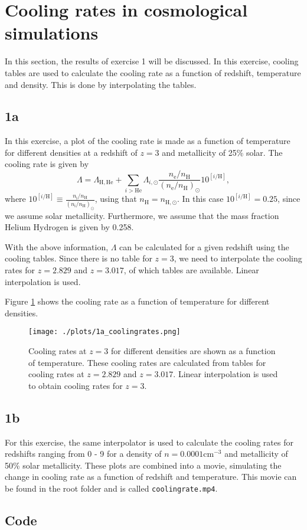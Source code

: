 
\section{Cooling rates in cosmological simulations}
In this section, the results of exercise 1 will be discussed. In this exercise, cooling tables are used to calculate the cooling rate as a function of redshift, temperature and density. This is done by interpolating the tables.

\subsection*{1a}
In this exercise, a plot of the cooling rate is made as a function of temperature for different densities at a redshift of $z=3$ and metallicity of 25\% solar. The cooling rate is given by 
\begin{equation}
    \Lambda = \Lambda_{\mathrm{H},\mathrm{He}} + \sum_{i>\mathrm{He}} \Lambda_{i,\odot} \frac{n_\mathrm{e}/n_\mathrm{H}}{(n_\mathrm{e}/n_\mathrm{H})_\odot} 10^{[i/\mathrm{H}]},
\end{equation}
where $10^{[i/\mathrm{H}]} \equiv \frac{n_\mathrm{i}/n_\mathrm{H}}{(n_\mathrm{i}/n_\mathrm{H})_\odot}$, using that $n_\mathrm{H} = n_{\mathrm{H},\odot}$. In this case $10^{[i/\mathrm{H}]} = 0.25$, since we assume solar metallicity. Furthermore, we assume that the mass fraction Helium Hydrogen is given by 0.258.

With the above information, $\Lambda$ can be calculated for a given redshift using the cooling tables. Since there is no table for $z=3$, we need to interpolate the cooling rates for $z=2.829$ and $z=3.017$, of which tables are available. Linear interpolation is used.

Figure \ref{fig:1a_coolingrates} shows the cooling rate as a function of temperature for different densities.

\begin{figure}[!ht]
  \centering
  \texttt{[image: ./plots/1a\_coolingrates.png]}
  \caption{Cooling rates at $z=3$ for different densities are shown as a function of temperature. These cooling rates are calculated from tables for cooling rates at $z=2.829$ and $z=3.017$. Linear interpolation is used to obtain cooling rates for $z=3$.}
  \label{fig:1a_coolingrates}
\end{figure}

\subsection*{1b}
For this exercise, the same interpolator is used to calculate the cooling rates for redshifts ranging from 0 - 9 for a density of $n = 0.0001 \mathrm{cm}^{−3}$ and metallicity of 50\% solar metallicity. These plots are combined into a movie, simulating the change in cooling rate as a function of redshift and temperature. This movie can be found in the root folder and is called \texttt{coolingrate.mp4}.

\pagebreak

\subsection*{Code}



\newpage
